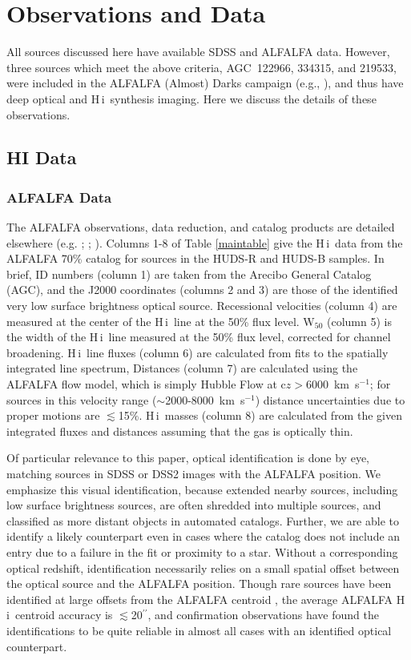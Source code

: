 \documentclass[twocolumn]{aastex6}
\def\kms{km~s$^{-1}$}
\def\arcsec{$^{\prime\prime}$}
\newcommand{\hi}{H{\sc\,i}}
\begin{document}
\section{Observations and Data}
\label{data}

All sources discussed here have available SDSS and ALFALFA data. However, 
three sources which meet the above criteria, AGC~122966, 334315, and 219533, were included in the ALFALFA (Almost) Darks campaign (e.g., \citealp{cannon15a}), and thus have deep optical and \hi\ synthesis imaging. Here we discuss the details of these observations. 

\subsection{HI Data}
\label{data.hi}

\subsubsection{ALFALFA Data}
\label{data.hi.alfalfa}
The ALFALFA observations, data reduction, and catalog products are detailed elsewhere (e.g. \citealp{giovanelli05a}; \citealp{saintonge07a}; \citealp{haynes11a}). Columns 1-8 of Table \ref{maintable} give the \hi\ data from the ALFALFA 70\% catalog for sources in the HUDS-R and HUDS-B samples. In brief, ID numbers (column 1) are taken from the Arecibo General Catalog (AGC), and the J2000 coordinates (columns 2 and 3) are those of the identified very low surface brightness optical source. Recessional velocities (column 4) are measured at the center of the \hi\ line at the 50\% flux level. W$_{50}$ (column 5) is the width of the \hi\ line measured at the 50\% flux level, corrected for channel broadening. \hi\ line fluxes (column 6) are calculated from fits to the spatially integrated line spectrum, Distances (column 7) are calculated using the ALFALFA flow model, which is simply Hubble Flow at c$z>6000$~\kms; for sources in this velocity range ($\sim$2000-8000~\kms) distance uncertainties due to proper motions are $\lesssim$15\%. \hi\ masses (column 8) are calculated from the given integrated fluxes and distances assuming that the gas is optically thin. 

Of particular relevance to this paper, optical identification is done by eye, matching sources in SDSS or DSS2 images with the ALFALFA position. We emphasize this visual identification, because extended nearby sources, including low surface brightness sources, are often shredded into multiple sources, and classified as more distant objects in automated catalogs. Further, we are able to identify a likely counterpart even in cases where the catalog does not include an entry due to a failure in the fit or proximity to a star. Without a corresponding optical redshift, identification necessarily relies on a small spatial offset between the optical source and the ALFALFA position. Though rare sources have been identified at large offsets from the ALFALFA centroid \citep{cannon15a}, the average ALFALFA \hi\ centroid accuracy is $\lesssim$20\arcsec, and confirmation observations have found the identifications to be quite reliable in almost all cases with an identified optical counterpart. 
\end{document}
